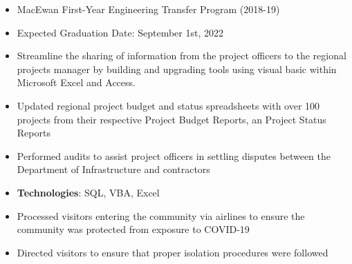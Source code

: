 \documentclass[10pt, letterpaper, ragged2e, withhyper]{altacv}
\begin{document}
\tagline{}

\makecvheader


\begin{paracol}{2}
        \begin{itemize}
            \item MacEwan First-Year Engineering Transfer Program (2018-19)
            \item Expected Graduation Date: September 1st, 2022
        \end{itemize}


            \begin{itemize}
                \item Streamline the sharing of information from the project officers to the regional 
                projects manager by building and upgrading tools using visual basic within Microsoft Excel and Access. 
                \item Updated regional project budget and status spreadsheets with over 100 projects from their respective Project 
                Budget Reports, an Project Status Reports
                \item Performed audits to assist project officers in settling disputes between the Department of Infrastructure and contractors 
                \item \textbf{Technologies}: SQL, VBA, Excel 
            \end{itemize}

            \begin{itemize}
                \item Processed visitors entering the community via airlines to ensure the community was protected from exposure to COVID-19
                \item Directed visitors to ensure that proper isolation procedures were followed
            \end{itemize}


\end{paracol}
\end{document}
